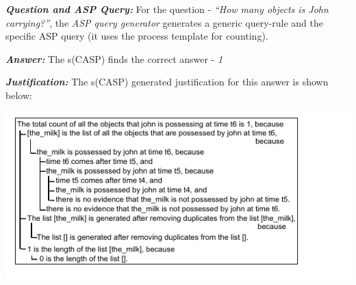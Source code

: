 \documentclass[letterpaper]{article}
\begin{document}
\smallskip

\noindent \textit{\textbf{Question and ASP Query: } }
For the question - \textit{``How many objects is John carrying?''}, the\textit{ ASP query generator} generates a generic query-rule and the specific ASP query (it uses the process template for counting).


\smallskip
\noindent
\cprotect {}

\smallskip 
\noindent \textit{\textbf{Answer: }} The s(CASP) finds the correct answer - \textit{1}


\noindent \textit{\textbf{Justification: }}
The s(CASP) generated justification for this answer is shown below: 

\smallskip

\noindent
\hbox {\hspace{-0.8em}\includegraphics [scale = 1.12]{justification.pdf}}
\end{document}
